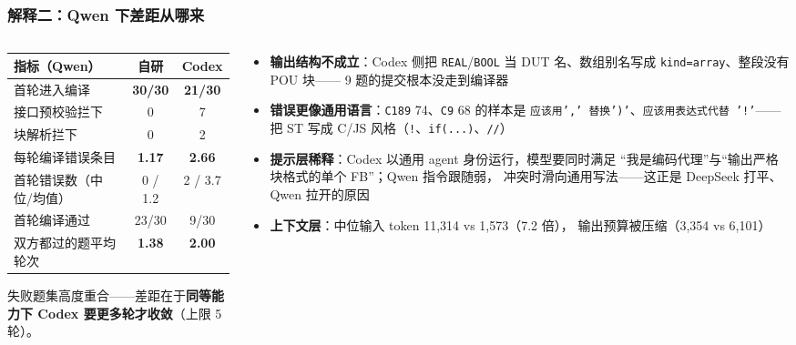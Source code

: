 \documentclass[10pt,aspectratio=169]{beamer}
\begin{document}
\begin{frame}
  \frametitle{解释二：Qwen 下差距从哪来}

  \begin{columns}[T]
    \begin{column}{0.5\textwidth}
      \centering
      \setlength{\tabcolsep}{4pt}
      \begin{tabular}{@{}lcc@{}}
        \hline
        指标（Qwen） & 自研 & Codex \\
        \hline
        首轮进入编译            & \textbf{30/30} & \textbf{21/30} \\
        \quad 接口预校验拦下    & 0 & 7 \\
        \quad 块解析拦下        & 0 & 2 \\
        每轮编译错误条目        & \textbf{1.17} & \textbf{2.66} \\
        首轮错误数（中位/均值） & 0 / 1.2 & 2 / 3.7 \\
        首轮编译通过            & 23/30 & 9/30 \\
        双方都过的题平均轮次    & \textbf{1.38} & \textbf{2.00} \\
        \hline
      \end{tabular}

      \vspace{2mm}
      \raggedright\small
      失败题集高度重合——差距在于\textbf{同等能力下 Codex 要更多轮才收敛}（上限 5 轮）。
    \end{column}
    \begin{column}{0.5\textwidth}
      \small
      \begin{itemize}
        \item \textbf{输出结构不成立}：Codex 侧把 \texttt{REAL}/\texttt{BOOL}
              当 DUT 名、数组别名写成 \texttt{kind=array}、整段没有 POU 块——
              9 题的提交根本没走到编译器
        \item \textbf{错误更像通用语言}：\texttt{C189} 74、\texttt{C9} 68 的样本是
              \texttt{应该用',' 替换')'}、\texttt{应该用表达式代替 '!'}——
              把 ST 写成 C/JS 风格（\texttt{!}、\texttt{if(...)}、\texttt{//}）
        \item \textbf{提示层稀释}：Codex 以通用 agent 身份运行，模型要同时满足
              “我是编码代理”与“输出严格块格式的单个 FB”；Qwen 指令跟随弱，
              冲突时滑向通用写法——这正是 DeepSeek 打平、Qwen 拉开的原因
        \item \textbf{上下文层}：中位输入 token 11,314 vs 1,573（7.2 倍），
              输出预算被压缩（3,354 vs 6,101）
      \end{itemize}
    \end{column}
  \end{columns}

\end{frame}
\end{document}
